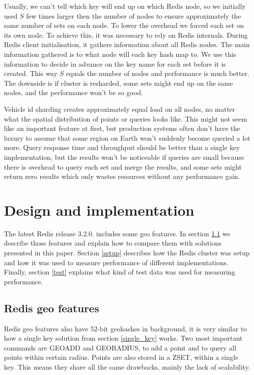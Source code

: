 \documentclass[times, utf8, diplomski]{fer}
\begin{document}
Usually, we can't tell which key will end up on which Redis node, so we initially used $S$ few times larger then the number of nodes to ensure approximately the same number of sets on each node. To lower the overhead we forced each set on its own node. To achieve this, it was necessary to rely on Redis internals. During Redis client initialisation, it gathers information about all Redis nodes. The main information gathered is to what node will each key hash map to. We use this information to decide in advance on the key name for each set before it is created. This way $S$ equals the number of nodes and performance is much better. The downside is if cluster is resharded, some sets  might end up on the same nodes, and the performance won't be so good.

Vehicle id sharding creates approximately equal load on all nodes, no matter what the spatial distribution of points or queries looks like. This might not seem like an important feature at first, but production systems often don't have the luxury to assume that some region on Earth won't suddenly become queried a lot more. Query response time and throughput should be better than a single key implementation, but the results won't be noticeable if queries are small because there is overhead to query each set and merge the results, and some sets might return zero results which only wastes resources without any performance gain.

\chapter {Design and implementation}
The latest Redis release 3.2.0. includes some geo features. In section \ref{redis_geo} we describe those features and explain how to compare them with solutions presented in this paper. Section \ref{setup} describes how the Redis cluster was setup and how it was used to measure performance of different implementations. Finally, section \ref{test} explains what kind of test data was used for measuring performance.

\section {Redis geo features} \label{redis_geo}
Redis geo features also have 52-bit geohashes in background, it is very similar to how a single key solution from section \ref{single_key} works. Two most important commands are GEOADD and GEORADIUS, to add a point and to query all points within certain radius. Points are also stored in a ZSET, within a single key. This means they share all the same drawbacks, mainly the lack of scalability.
\end{document}
